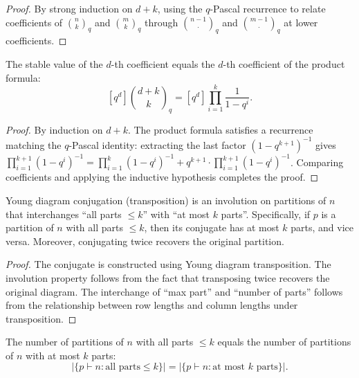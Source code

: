 \begin{proof}
\leanok
By strong induction on $d + k$, using the $q$-Pascal recurrence to relate
coefficients of $\binom{n}{k}_q$ and $\binom{m}{k}_q$ through $\binom{n-1}{\cdot}_q$
and $\binom{m-1}{\cdot}_q$ at lower coefficients.
\end{proof}

\begin{lemma}
\label{lem.qbinomial-formulas.stable-eq-prod}
\leanhelper
\leanok
The stable value of the $d$-th coefficient equals the $d$-th coefficient of
the product formula:
\[
[q^d]\binom{d+k}{k}_q = [q^d]\prod_{i=1}^{k} \frac{1}{1 - q^i}.
\]
\end{lemma}

\begin{proof}
\leanok
By induction on $d + k$. The product formula satisfies a recurrence matching
the $q$-Pascal identity: extracting the last factor $(1 - q^{k+1})^{-1}$ gives
$\prod_{i=1}^{k+1}(1-q^i)^{-1} = \prod_{i=1}^{k}(1-q^i)^{-1} + q^{k+1} \cdot \prod_{i=1}^{k+1}(1-q^i)^{-1}$.
Comparing coefficients and applying the inductive hypothesis completes the proof.
\end{proof}

\begin{lemma}
\label{lem.qbinomial-formulas.conjugation-involution}
\leanhelper
\leanok
Young diagram conjugation (transposition) is an involution on partitions of $n$
that interchanges ``all parts $\le k$'' with ``at most $k$ parts''.
Specifically, if $p$ is a partition of $n$ with all parts $\le k$,
then its conjugate has at most $k$ parts, and vice versa.
Moreover, conjugating twice recovers the original partition.
\end{lemma}

\begin{proof}
\leanok
The conjugate is constructed using Young diagram transposition.
The involution property follows from the fact that transposing twice recovers
the original diagram.
The interchange of ``max part'' and ``number of parts'' follows from
the relationship between row lengths and column lengths under transposition.
\end{proof}

\begin{lemma}
\label{lem.qbinomial-formulas.restricted-eq-atmost}
\leanhelper
\leanok
The number of partitions of $n$ with all parts $\le k$ equals the number of
partitions of $n$ with at most $k$ parts:
\[
|\{p \vdash n : \text{all parts} \le k\}| = |\{p \vdash n : \text{at most } k \text{ parts}\}|.
\]
\end{lemma}

